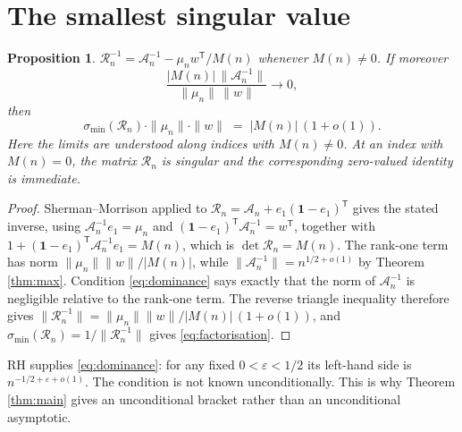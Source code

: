\documentclass[11pt]{article}
\newtheorem{proposition}[theorem]{Proposition}
\theoremstyle{definition}
\theoremstyle{remark}
\newcommand{\Rc}{\mathcal{R}}
\newcommand{\Ac}{\mathcal{A}}
\begin{document}
\section{The smallest singular value}\label{sec:sigmamin}

\begin{proposition}\label{prop:sm}
$\Rc_n^{-1}=\Ac_n^{-1}-\mu_n w^{\mathsf T}/M(n)$ whenever $M(n)\ne0$. If moreover
\begin{equation}\label{eq:dominance}
 \frac{|M(n)|\,\|\Ac_n^{-1}\|}{\|\mu_n\|\,\|w\|}\longrightarrow0,
\end{equation}
then
\begin{equation}\label{eq:factorisation}
  \sigma_{\min}(\Rc_n)\cdot\|\mu_n\|\cdot\|w\| \;=\; |M(n)|\,(1+o(1)).
\end{equation}
Here the limits are understood along indices with $M(n)\ne0$. At an index with
$M(n)=0$, the matrix $\Rc_n$ is singular and the corresponding zero-valued
identity is immediate.
\end{proposition}

\begin{proof}
Sherman--Morrison applied to $\Rc_n=\Ac_n+e_1(\mathbf 1-e_1)^{\mathsf T}$ gives the
stated inverse, using $\Ac_n^{-1}e_1=\mu_n$ and $(\mathbf 1-e_1)^{\mathsf
T}\Ac_n^{-1}=w^{\mathsf T}$, together with $1+(\mathbf
1-e_1)^{\mathsf T}\Ac_n^{-1}e_1=M(n)$, which is $\det\Rc_n=M(n)$. The rank-one
term has norm $\|\mu_n\|\|w\|/|M(n)|$, while $\|\Ac_n^{-1}\|=n^{1/2+o(1)}$ by
Theorem \ref{thm:max}. Condition \eqref{eq:dominance} says exactly that the norm
of $\Ac_n^{-1}$ is negligible relative to the rank-one term. The reverse
triangle inequality therefore gives
$\|\Rc_n^{-1}\|=\|\mu_n\|\|w\|/|M(n)|\,(1+o(1))$, and
$\sigma_{\min}(\Rc_n)=1/\|\Rc_n^{-1}\|$ gives
\eqref{eq:factorisation}.
\end{proof}

RH supplies \eqref{eq:dominance}: for any fixed $0<\varepsilon<1/2$ its left-hand
side is $n^{-1/2+\varepsilon+o(1)}$. The condition is not known unconditionally.
This is why Theorem \ref{thm:main} gives an unconditional bracket rather than an
unconditional asymptotic.
\end{document}
